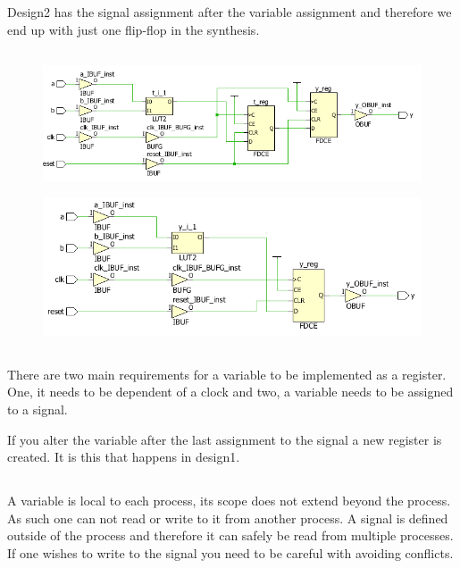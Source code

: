 \documentclass{article}
\begin{document}
Design2 has the signal assignment after the variable assignment and
therefore we end up with just one flip-flop in the synthesis.

\subsection{}
\begin{figure}[hbp]
  \centering
  \includegraphics[width=\textwidth]{images/task2-design1}
\end{figure}

\begin{figure}[hbp]
  \centering
  \includegraphics[width=\textwidth]{images/task2-design2}
\end{figure}

\subsection{}
There are two main requirements for a variable to be implemented as a
register. One, it needs to be dependent of a clock and two, a variable
needs to be assigned to a signal.

If you alter the variable after the last assignment to the signal a
new register is created. It is this that happens in design1.

\subsection{}
A variable is local to each process, its scope does not extend beyond
the process. As such one can not read or write to it from another
process. A signal is defined outside of the process and therefore
it can safely be read from multiple processes. If one wishes to write
to the signal you need to be careful with avoiding conflicts.
\end{document}

